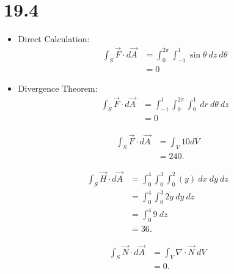 \documentclass[8pt]{extarticle}
\title{}
\author{}
\date{}
\begin{document}
  \section{19.4}%
  \begin{description}[font=\normalfont]
    \item[2:]\hfill
      \begin{itemize}
        \item Direct Calculation:
          \begin{align*}
            \int_{S} \vec{F} \cdot d\vec{A} &= \int_{0}^{2\pi}\int_{-1}^{1}\sin\theta~dz~d\theta\\
                                            &= 0
          \end{align*}
        \item Divergence Theorem:
          \begin{align*}
            \int_{S} \vec{F} \cdot d\vec{A} &= \int_{-1}^{1}\int_{0}^{2\pi}\int_{0}^{1}~dr~d\theta~dz\\
                                            &= 0
          \end{align*}
      \end{itemize}
    \item[4:]
    \item[6:]
      \begin{align*}
        \int_{S} \vec{F} \cdot d\vec{A} &= \int_{V} 10 dV\\
                                        &= 240.
      \end{align*}
    \item[8:]
      \begin{align*}
        \int_{S} \vec{H} \cdot d\vec{A} &= \int_{0}^{4}\int_{0}^{3}\int_{0}^{2}(y)~dx~dy~dz\\
                                        &= \int_{0}^{4}\int_{0}^{3}2y~dy~dz\\
                                        &= \int_{0}^{4}9~dz\\
                                        &= 36.
      \end{align*}
    \item[10:]
      \begin{align*}
        \int_{S}\vec{N}\cdot d\vec{A} &= \int_{V} \nabla \cdot \vec{N}~dV\\
                                      &= 0.
      \end{align*}
    \item[14:]
      \begin{align*}

\end{align*}
\end{description}
\end{document}
